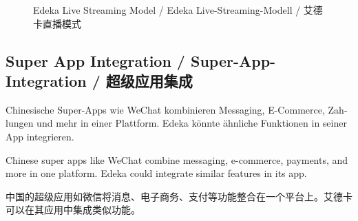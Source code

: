 \begin{figure}[h]
\caption{Edeka Live Streaming Model / Edeka Live-Streaming-Modell / 艾德卡直播模式}
\end{figure}

\subsection{Super App Integration / Super-App-Integration / 超级应用集成}

\begin{otherlanguage}{ngerman}
Chinesische Super-Apps wie WeChat kombinieren Messaging, E-Commerce, Zahlungen und mehr in einer Plattform. Edeka könnte ähnliche Funktionen in seiner App integrieren.
\end{otherlanguage}

Chinese super apps like WeChat combine messaging, e-commerce, payments, and more in one platform. Edeka could integrate similar features in its app.

中国的超级应用如微信将消息、电子商务、支付等功能整合在一个平台上。艾德卡可以在其应用中集成类似功能。

